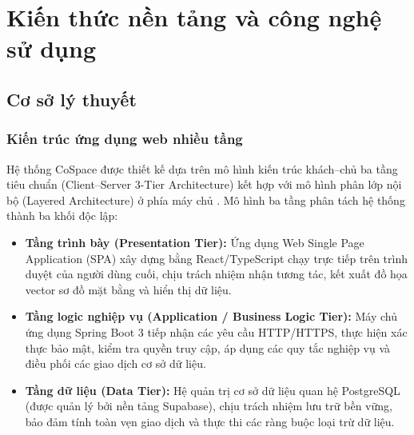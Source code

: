 \chapter{Kiến thức nền tảng và công nghệ sử dụng}
\label{ch:nentang}

\section{Cơ sở lý thuyết}
\label{sec:coso_lythuyet}

\subsection{Kiến trúc ứng dụng web nhiều tầng}
Hệ thống CoSpace được thiết kế dựa trên mô hình kiến trúc khách--chủ ba tầng tiêu chuẩn (Client--Server 3-Tier Architecture) kết hợp với mô hình phân lớp nội bộ (Layered Architecture) ở phía máy chủ \cite{martin2017clean}. Mô hình ba tầng phân tách hệ thống thành ba khối độc lập:
\begin{itemize}
    \item \textbf{Tầng trình bày (Presentation Tier):} Ứng dụng Web Single Page Application (SPA) xây dựng bằng React/TypeScript chạy trực tiếp trên trình duyệt của người dùng cuối, chịu trách nhiệm nhận tương tác, kết xuất đồ họa vector sơ đồ mặt bằng và hiển thị dữ liệu.
    \item \textbf{Tầng logic nghiệp vụ (Application / Business Logic Tier):} Máy chủ ứng dụng Spring Boot 3 tiếp nhận các yêu cầu HTTP/HTTPS, thực hiện xác thực bảo mật, kiểm tra quyền truy cập, áp dụng các quy tắc nghiệp vụ và điều phối các giao dịch cơ sở dữ liệu.
    \item \textbf{Tầng dữ liệu (Data Tier):} Hệ quản trị cơ sở dữ liệu quan hệ PostgreSQL (được quản lý bởi nền tảng Supabase), chịu trách nhiệm lưu trữ bền vững, bảo đảm tính toàn vẹn giao dịch và thực thi các ràng buộc loại trừ dữ liệu.
\end{itemize}


